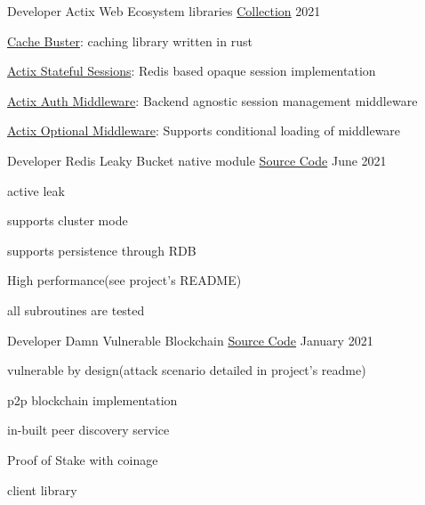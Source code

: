 \begin{cventries}
    \cventry
    {Developer} %
    {Actix Web Ecosystem libraries} %
    {\href{https://github.com/realaravinth?tab=repositories&q=actix&type=&language=&sort=}{Collection}} %
    {2021} %
    {
     \begin{cvitems} %
      \item {{\href{https://github.com/realaravinth/cache-buster}{Cache Buster}}: caching library written in rust}
	   \item {{\href{https://github.com/realaravinth/actix-stateful-sessions}{Actix Stateful Sessions}}: Redis based opaque session implementation}
	   \item {{\href{https://github.com/realaravinth/actix-auth-middleware}{Actix Auth Middleware}}: Backend agnostic session management middleware}
	   \item {{\href{https://github.com/realaravinth/actix-optional-middleware}{Actix Optional Middleware}}: Supports conditional loading of middleware}
      \end{cvitems}
    }
  \cventry
    {Developer} %
    {Redis Leaky Bucket native module} %
    {\href{https://github.com/realaravinth/redis-leaky-bucket}{Source Code}} %
    {June 2021} %
    {
      \begin{cvitems} %
      \item {active leak}
        \item {supports cluster mode}
        \item {supports persistence through RDB}
        \item {High performance(see project's README)}
    	\item {all subroutines are tested}
      \end{cvitems}
    }
  \cventry
    {Developer} %
    {Damn Vulnerable Blockchain} %
    {\href{https://github.com/realaravinth/damn-vuln-blockchain}{Source Code}} %
    {January 2021} %
    {
      \begin{cvitems} %
      \item {vulnerable by design(attack scenario detailed in project's readme)}
        \item {p2p blockchain implementation}
        \item {in-built peer discovery service}
        \item {Proof of Stake with coinage}
        \item {client library}

\end{cvitems}}
\end{cventries}
